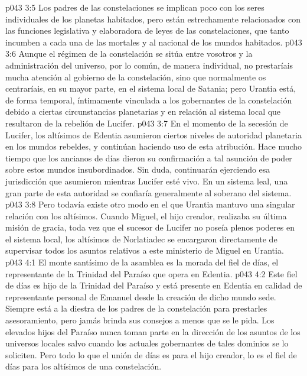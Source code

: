 \vs p043 3:5 \pc Los padres de las constelaciones se implican poco con los seres individuales de los planetas habitados, pero están estrechamente relacionados con las funciones legislativa y elaboradora de leyes de las constelaciones, que tanto incumben a cada una de las  mortales y al  nacional de los mundos habitados.
\vs p043 3:6 Aunque el régimen de la constelación se sitúa entre vosotros y la administración del universo, por lo común, de manera individual, no prestaríais mucha atención al gobierno de la constelación, sino que normalmente os centraríais, en su mayor parte, en el sistema local de Satania; pero Urantia está, de forma temporal, íntimamente vinculada a los gobernantes de la constelación debido a ciertas circunstancias planetarias y en relación al sistema local que resultaron de la rebelión de Lucifer.
\vs p043 3:7 En el momento de la secesión de Lucifer, los altísimos de Edentia asumieron ciertos niveles de autoridad planetaria en los mundos rebeldes, y continúan haciendo uso de esta atribución. Hace mucho tiempo que los ancianos de días dieron su confirmación a tal asunción de poder sobre estos mundos insubordinados. Sin duda, continuarán ejerciendo esa jurisdicción que asumieron mientras Lucifer esté vivo. En un sistema leal, una gran parte de esta autoridad se confiaría generalmente al soberano del sistema.
\vs p043 3:8 Pero todavía existe otro modo en el que Urantia mantuvo una singular relación con los altísimos. Cuando Miguel, el hijo creador, realizaba su última misión de gracia, toda vez que el sucesor de Lucifer no poseía plenos poderes en el sistema local, los altísimos de Norlatiadec se encargaron directamente de supervisar todos los asuntos relativos a este ministerio de Miguel en Urantia.
\vs p043 4:1 El monte santísimo de la asamblea es la morada del fiel de días, el representante de la Trinidad del Paraíso que opera en Edentia.
\vs p043 4:2 Este fiel de días es hijo de la Trinidad del Paraíso y está presente en Edentia en calidad de representante personal de Emanuel desde la creación de dicho mundo sede. Siempre está a la diestra de los padres de la constelación para prestarles asesoramiento, pero jamás brinda sus consejos a menos que se le pida. Los elevados hijos del Paraíso nunca toman parte en la dirección de los asuntos de los universos locales salvo cuando los actuales gobernantes de tales dominios se lo soliciten. Pero todo lo que el unión de días es para el hijo creador, lo es el fiel de días para los altísimos de una constelación.
